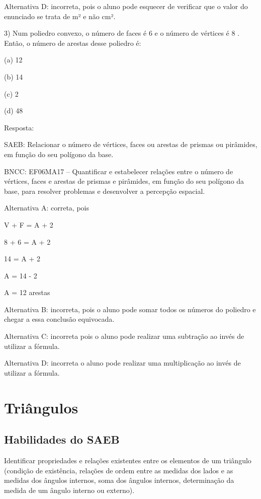 Alternativa D: incorreta, pois o aluno pode esquecer de verificar que o
valor do enunciado se trata de m² e não cm².

3) Num poliedro convexo, o número de faces é 6 e o número de vértices é
8 . Então, o número de arestas desse poliedro é:

(a) 12

(b) 14

(c) 2

(d) 48

Resposta:

SAEB: Relacionar o número de vértices, faces ou arestas de prismas ou
pirâmides, em função do seu polígono da base.

BNCC: EF06MA17 -- Quantificar e estabelecer relações entre o número de
vértices, faces e arestas de prismas e pirâmides, em função do seu
polígono da base, para resolver problemas e desenvolver a percepção
espacial.

Alternativa A: correta, pois

V + F = A + 2

8 + 6 = A + 2

14 = A + 2

A = 14 - 2

A = 12 arestas

Alternativa B: incorreta, pois o aluno pode somar todos os números do
poliedro e chegar a essa conclusão equivocada.

Alternativa C: incorreta pois o aluno pode realizar uma subtração ao
invés de utilizar a fórmula.

Alternativa D: incorreta o aluno pode realizar uma multiplicação ao
invés de utilizar a fórmula.

\chapter{Triângulos}

\section{Habilidades do SAEB} 

Identificar propriedades e relações existentes
entre os elementos de um triângulo (condição de existência, relações de
ordem entre as medidas dos lados e as medidas dos ângulos internos, soma
dos ângulos internos, determinação da medida de um ângulo interno ou
externo).

